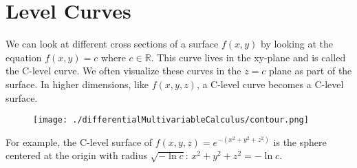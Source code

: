 \section{Level Curves}
\noindent
We can look at different cross sections of a surface $f(x,y)$ by looking at the equation $f(x,y) = c$ where $c \in \mathbb{R}$.
This curve lives in the xy-plane and is called the C-level curve.
We often visualize these curves in the $z=c$ plane as part of the surface.
In higher dimensions, like $f(x,y,z)$, a C-level curve becomes a C-level surface.

\begin{figure}[H]
	\centering
	\texttt{[image: ./differentialMultivariableCalculus/contour.png]}
\end{figure}
\noindent
For example, the C-level surface of $f(x,y,z) = e^{-\left(x^2+y^2+z^2\right)}$ is the sphere centered at the origin with radius $\sqrt{-\ln{c}}$: $x^2 + y^2 + z^ 2 =-\ln{c}$.